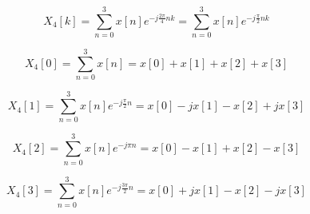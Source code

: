 \documentclass[11pt]{article}
\begin{document}
\[X_4[k] = \sum_{n=0}^{3} x[n] e^{-j\frac{2\pi}{4}nk} = \sum_{n=0}^{3} x[n] e^{-j\frac{\pi}{2}nk} \]

\[X_4[0] = \sum_{n=0}^{3} x[n] = x[0] + x[1] + x[2] + x[3]\]

\[X_4[1] = \sum_{n=0}^{3} x[n] e^{-j\frac{\pi}{2}n} = x[0] - jx[1] - x[2] + jx[3]\]

\[X_4[2] = \sum_{n=0}^{3} x[n] e^{-j\pi n} = x[0] - x[1] + x[2] - x[3]\]

\[X_4[3] = \sum_{n=0}^{3} x[n] e^{-j\frac{3\pi}{2} n} = x[0] + jx[1] - x[2] - jx[3]\]
\end{document}
